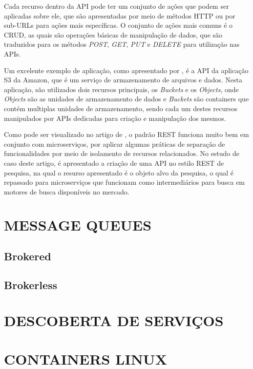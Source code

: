 Cada recurso dentro da \ac{API} pode ter um conjunto de ações que podem ser
aplicadas sobre ele, que são apresentadas por meio de métodos \ac{HTTP} ou
por sub-\ac{URLs} para ações mais específicas. O conjunto de ações mais
comuns é o \ac{CRUD}, as quais são operações básicas de manipulação de dados,
que são traduzidos para os métodos \emph{POST}, \emph{GET}, \emph{PUT} e
\emph{DELETE} para utilização nas \ac{APIs}.

Um excelente exemplo de aplicação, como apresentado por
, é a \ac{API} da aplicação S3 da Amazon, que é
um serviço de armazenamento de arquivos e dados. Nesta aplicação, são
utilizados dois recursos principais, os \emph{Buckets} e os \emph{Objects},
onde \emph{Objects} são as unidades de armazenamento de dados e \emph{Buckets}
são containers que contém multiplas unidades de armazenamento, sendo cada
um destes recursos manipulados por \ac{APIs} dedicadas para criação e
manipulação dos mesmos.

Como pode ser visualizado no artigo de  , o padrão
\ac{REST} funciona muito bem em conjunto com microserviços, por aplicar algumas
práticas de separação de funcionalidades por meio de isolamento de recursos
relacionados. No estudo de caso deste artigo, é apresentado a criação de uma
\ac{API} no estilo \ac{REST} de pesquisa, na qual o resurso apresentado é o
objeto alvo da pesquisa, o qual é repassado para microserviços que funcionam
como intermediários para busca em motores de busca disponíveis no mercado.

\section{MESSAGE QUEUES}

\subsection{Brokered}

\subsection{Brokerless}

\section{DESCOBERTA DE SERVIÇOS}

\section{CONTAINERS LINUX}

